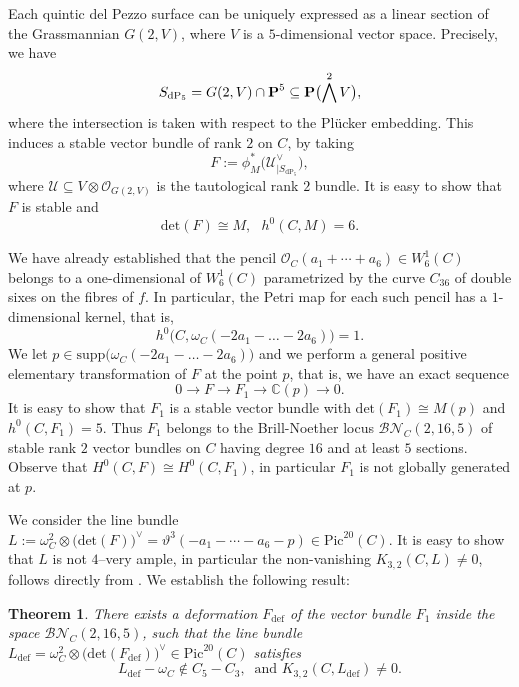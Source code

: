 \documentclass[11pt]{amsart}
\newtheorem{theorem}{Theorem}[section]
\theoremstyle{definition}
\def\PP{{\textbf P}}
\def\OO{\mathcal{O}}
\def\cU{\mathcal{U}}
\begin{document}
\vskip 3pt

Each quintic del Pezzo surface can be uniquely expressed as a linear section of the Grassmannian $G(2,V)$, where $V$ is a $5$-dimensional vector space. Precisely, we have 
$$S_{\mathrm{dP}_5}=G(2,V)\cap \PP^5\subseteq \PP\bigl(\bigwedge^2 V\bigr),$$
where the intersection is taken with respect to the Pl\"ucker embedding. This induces a stable vector bundle of rank $2$ on $C$, by taking 
$$F:=\phi_M^*\bigl(\cU_{|S_{\mathrm{dP}_5}}^{\vee}\bigr),$$
where $\cU\subseteq V\otimes \OO_{G(2,V)}$ is the tautological rank $2$ bundle. It is easy to show that $F$ is stable and 
$$\mbox{det}(F)\cong M, \ \ \ h^0(C,M)=6.$$

\vskip 4pt

We have already established that the pencil $\OO_C(a_1+\cdots+a_6)\in W^1_6(C)$ belongs to a one-dimensional of $W^1_6(C)$ parametrized by the curve $C_{36}$ of double sixes on the fibres of $f$. In particular, the Petri map for each such pencil has a $1$-dimensional kernel, that is, 
$$h^0\bigl(C, \omega_C(-2a_1-\ldots-2a_6)\bigr)=1.$$
We let $p\in \mbox{supp}\bigl(\omega_C(-2a_1-\ldots-2a_6)\bigr)$ and we perform a general positive elementary transformation of $F$ at the point $p$, that is, we have an exact sequence
$$0\longrightarrow F\longrightarrow F_1\longrightarrow \mathbb C(p)\longrightarrow 0.$$
It is easy to show that $F_1$ is a stable vector bundle with $\mbox{det}(F_1)\cong M(p)$ and $h^0(C,F_1)=5$. Thus $F_1$ belongs to the Brill-Noether locus $\mathcal{BN}_C(2, 16, 5)$ of stable rank $2$ vector bundles on $C$ having degree $16$ and at least $5$ sections. Observe that $H^0(C,F)\cong H^0(C, F_1)$, in particular $F_1$ is not globally generated at $p$. 

\vskip 3pt

We consider the line bundle $L:=\omega_C^2\otimes \bigl(\mbox{det}(F)\bigr)^{\vee}=\vartheta^3(-a_1-\cdots-a_6-p)\in \mbox{Pic}^{20}(C)$. It is easy to show that $L$ is not $4$--very ample, in particular the non-vanishing $K_{3,2}(C,L)\neq 0$, follows directly from \cite{GL}. We establish the following result:

\begin{theorem}\label{th:def_GL}
There exists a deformation $F_{\mathrm{def}}$ of the vector bundle $F_1$ inside the space $\mathcal{BN}_C(2, 16,5)$, such that  the line bundle $L_{\mathrm{def}}=\omega_C^{2}\otimes \bigl(\mathrm{det}(F_{\mathrm{def}})\bigr)^{\vee}\in \mathrm{Pic}^{20}(C)$ satisfies
$$L_{\mathrm{def}}-\omega_C\notin C_5-C_3, \ \mbox{  and } K_{3,2}(C,L_{\mathrm{def}})\neq 0.$$
\end{theorem}
\end{document}
